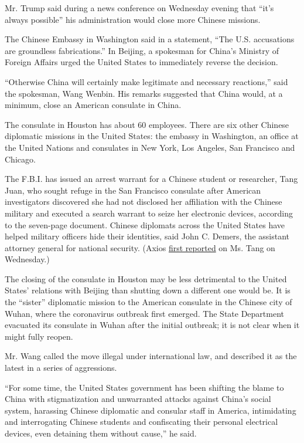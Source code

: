 Mr. Trump said during a news conference on Wednesday evening that ``it's
always possible'' his administration would close more Chinese missions.

The Chinese Embassy in Washington said in a statement, ``The U.S.
accusations are groundless fabrications.'' In Beijing, a spokesman for
China's Ministry of Foreign Affairs urged the United States to
immediately reverse the decision.

``Otherwise China will certainly make legitimate and necessary
reactions,'' said the spokesman, Wang Wenbin. His remarks suggested that
China would, at a minimum, close an American consulate in China.

The consulate in Houston has about 60 employees. There are six other
Chinese diplomatic missions in the United States: the embassy in
Washington, an office at the United Nations and consulates in New York,
Los Angeles, San Francisco and Chicago.

The F.B.I. has issued an arrest warrant for a Chinese student or
researcher, Tang Juan, who sought refuge in the San Francisco consulate
after American investigators discovered she had not disclosed her
affiliation with the Chinese military and executed a search warrant to
seize her electronic devices, according to the seven-page document.
Chinese diplomats across the United States have helped military officers
hide their identities, said John C. Demers, the assistant attorney
general for national security. (Axios
\href{https://www.axios.com/san-francisco-consulate-harboring-chinese-military-researcher-fbi-17325706-7983-4b17-aa6f-f19a450b646b.html}{first
reported} on Ms. Tang on Wednesday.)

The closing of the consulate in Houston may be less detrimental to the
United States' relations with Beijing than shutting down a different one
would be. It is the ``sister'' diplomatic mission to the American
consulate in the Chinese city of Wuhan, where the coronavirus outbreak
first emerged. The State Department evacuated its consulate in Wuhan
after the initial outbreak; it is not clear when it might fully reopen.

Mr. Wang called the move illegal under international law, and described
it as the latest in a series of aggressions.

``For some time, the United States government has been shifting the
blame to China with stigmatization and unwarranted attacks against
China's social system, harassing Chinese diplomatic and consular staff
in America, intimidating and interrogating Chinese students and
confiscating their personal electrical devices, even detaining them
without cause,'' he said.

